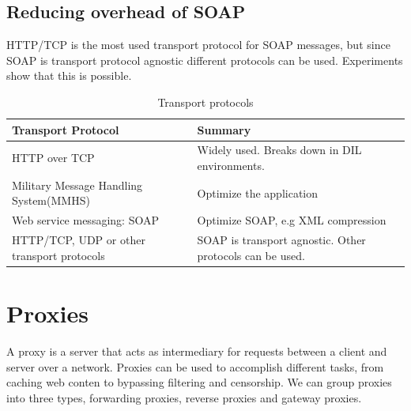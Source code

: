 \documentclass[USenglish]{article}
\begin{document}
\subsection{Reducing overhead of SOAP}
HTTP/TCP is the most used transport protocol for SOAP messages, but since SOAP is transport protocol agnostic different protocols can be used. Experiments show that this is possible.


\begin{table}[h]
\begin{tabularx}{\textwidth}{| X | X |}
\hline
  \textbf{Transport Protocol} & \textbf{Summary} \\ \hline
  HTTP over TCP & Widely used. Breaks down in DIL environments.\\ \hline
  Military Message Handling System(MMHS) & Optimize the application\\ \hline
  Web service messaging: SOAP & Optimize SOAP, e.g XML compression \\ \hline
  HTTP/TCP, UDP or other transport protocols & SOAP is transport agnostic. Other protocols can be used. \\ \hline
\end{tabularx}
\caption{Transport protocols}
\end{table}

\section{Proxies}
A proxy is a server that acts as intermediary for requests between a client and server over a network. Proxies can be used to accomplish different tasks, from caching web conten to bypassing filtering and censorship. We can group proxies into three types, forwarding proxies, reverse proxies and gateway proxies.
\end{document}
